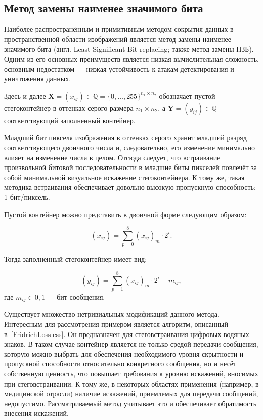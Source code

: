 \subsection{Метод замены наименее значимого бита}

Наиболее распространённым и примитивным методом сокрытия данных в пространственной области изображений является метод замены наименее значимого бита (англ. Least Significant Bit replacing; также метод замены НЗБ). Одним из его основных преимуществ является низкая вычислительная сложность, основным недостатком --- низкая устойчивость к атакам детектирования и уничтожения данных.

Здесь и далее $ \mathbf{X} = (x_{ij}) \in \mathbb{Q} = \{0, \dotsc, 255\}^{n_1 \times n_2} $ обозначает пустой стегоконтейнер в оттенках серого размера $ {n_1 \times n_2} $, а $ \mathbf{Y} = (y_{ij}) \in \mathbb{Q} $~--- соответствующий заполненный контейнер.

Младший бит пикселя изображения в оттенках серого хранит младший разряд соответствующего двоичного числа и, следовательно, его изменение минимально влияет на изменение числа в целом. Отсюда следует, что встраивание произвольной битовой последовательности в младшие биты пикселей повлечёт за собой минимальной визуальное искажение стегоконтейнера. К тому же, такая методика встраивания обеспечивает довольно высокую пропускную способность: 1 бит/пиксель.

Пустой контейнер можно представить в двоичной форме следующим образом:

\begin{equation*}
(x_{ij}) = \sum_{p = 0}^8 (x_{ij})_m \cdot 2^i.
\end{equation*}

Тогда заполненный стегоконтейнер имеет вид:

\begin{equation*}
(y_{ij}) = \sum_{p = 1}^8 (x_{ij})_m \cdot 2^i + m_{ij},
\end{equation*}
где $ m_{ij} \in {0, 1} $ --- бит сообщения.

Существует множество нетривиальных модификаций данного метода. Интересным для рассмотрения примером является алгоритм, описанный в~\ref{FridrichLossless}. Он предназначен для стеговстраивания цифровых водяных знаков. В таком случае контейнер является не только средой передачи сообщения, которую можно выбрать для обеспечения необходимого уровня скрытности и пропускной способности относительно конкретного сообщения, но и несёт собственную ценность, что повышает требования к уровню искажений, вносимых при стеговстраивании. К тому же, в некоторых областях применения (например, в медицинской отрасли) наличие искажений, приемлемых для передачи сообщений, недопустимо. Рассматриваемый метод учитывает это и обеспечивает обратимость внесения искажений.

